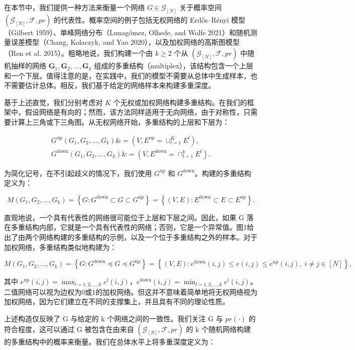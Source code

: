\documentclass[
  10
]{article}
\begin{document}
在本节中，我们提供一种方法来衡量一个网络 $G\in\mathcal{G}_{[N]}$ 关于概率空间 $(\mathcal{G}_{[N]},\mathcal{F},pr)$ 的代表性。概率空间的例子包括无权网络的 Erdős–Rényi 模型（Gilbert 1959）、单峰网络分布（Lunagómez, Olhede, and Wolfe 2021）和随机测量误差模型（Chang, Kolaczyk, and Yao 2020），以及加权网络的高斯图模型（Ren et al. 2015）。粗略地说，我们构建一个由 $k\geq 2$ 个从 $(\mathcal{G}_{[N]},\mathcal{F},pr)$ 中随机抽样的网络 $\mathbf{G}_1,\mathbf{G}_2,\dots,\mathbf{G}_k$ 组成的多重结构（multiplex），该结构包含一个上层和一个下层。值得注意的是，在实践中，我们的模型不需要从总体中生成样本，也不需要估计总体。相反，我们基于给定的网络样本来构建多重深度。

基于上述直觉，我们分别考虑对 $K$ 个无权或加权网络构建多重结构。在我们的框架中，假设网络是有向的；然而，该方法同样适用于无向网络，由于对称性，只需要计算上三角或下三角图。从无权网络开始，多重结构的上层和下层为：

$$
\begin{aligned}
G^{\mathrm{up}}(G_1,G_2,\dots,G_k) \&= (V, E^{\mathrm{up}}=\cup_{l=1}^K E^l),\\
G^{\mathrm{down}}(G_1,G_2,\dots,G_k) \&= (V, E^{\mathrm{down}}=\cap_{l=1}^k E^l).
\end{aligned}
$$

为简化记号，在不引起歧义的情况下，我们使用 $G^{\mathrm{up}}$ 和 $G^{\mathrm{down}}$。构建的多重结构定义为：

$$
M(G_1,G_2,\dots,G_k) = \left\{G: G^{\mathrm{down}}\subset G\subset G^{\mathrm{up}}\right\}
= \left\{(V,E): E^{\mathrm{down}}\subset E\subset E^{\mathrm{up}}\right\}.
$$

直观地说，一个具有代表性的网络很可能位于上层和下层之间。因此，如果 G 落在多重结构内部，它就是一个具有代表性的网络；否则，它是一个异常值。图1给出了由两个网络构建的多重结构的示例，以及一个位于多重结构之外的样本。对于加权网络，多重结构类似地构建为：

$$
M(G_1,G_2,\dots,G_k) = \left\{G: G^{\mathrm{down}}\preceq G\preceq G^{\mathrm{up}}\right\}
= \left\{(V,E): e^{\mathrm{down}}(i,j)\leq e(i,j)\leq e^{\mathrm{up}}(i,j),\; i\neq j\in[N]\right\},
$$

其中 $e^{\mathrm{up}}(i,j)=\max_{l=1,2,\dots,k}e^l(i,j)$，$e^{\mathrm{down}}(i,j)=\min_{l=1,2,\dots,k}e^l(i,j)$。二值网络可以视为边权为0或1的加权网络。但这并不意味着简单地将无权网络视为加权网络，因为它们建立在不同的支撑集上，并且具有不同的理论性质。

上述构造仅反映了 G 与给定的 k 个网络之间的一致性。我们关注 G 与 $pr(\cdot)$ 的符合程度，这可以通过 G 被包含在由来自 $(\mathcal{G}_{[N]},\mathcal{F},pr)$ 的 k 个随机网络构建的多重结构中的概率来衡量。我们在总体水平上将多重深度定义为：
\end{document}
